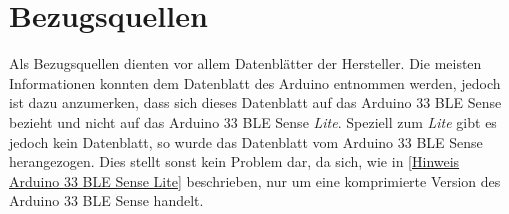 \section{Bezugsquellen}
Als Bezugsquellen dienten vor allem Datenblätter der Hersteller. Die meisten Informationen konnten dem Datenblatt des Arduino entnommen werden, jedoch ist dazu anzumerken, dass sich dieses Datenblatt auf das Arduino 33 BLE Sense bezieht und nicht auf das Arduino 33 BLE Sense \emph{Lite}. Speziell zum \emph{Lite} gibt es jedoch kein Datenblatt, so wurde das Datenblatt vom Arduino 33 BLE Sense herangezogen. Dies stellt sonst kein Problem dar, da sich, wie in \ref{Hinweis Arduino 33 BLE Sense Lite} beschrieben, nur um eine komprimierte Version des Arduino 33 BLE Sense handelt.


